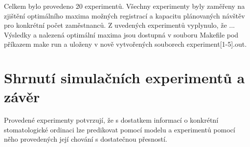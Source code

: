 \documentclass[a4paper,11pt,titlepage]{article}
\begin{document}
Celkem bylo provedeno 20 experimentů. Všechny experimenty byly zaměřeny na zjištění optimálního maxima možných registrací a kapacitu plánovaných návštěv pro konkrétní počet zaměstnanců. Z uvedených experimentů vyplynulo, že ...
\newline
Výsledky a nalezená optimální maxima jsou dostupná v souboru Makefile pod příkazem make run a uloženy v nově vytvořených souborech experiment[1-5].out.

\section{Shrnutí simulačních experimentů a závěr}

Provedené experimenty potvrzují, že s dostatkem informací o konkrétní stomatologické ordinaci lze predikovat pomocí modelu a experimentů pomocí něho provedených její chování s dostatečnou přesností.

\newpage

\nocite{*}




\newpage
\thispagestyle{empty}
\end{document}
